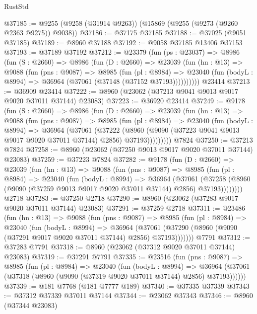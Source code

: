 \begin{lexlean}{RustStd}
\begin{coremodule}
@37185 := @9255 (@9258 (@31914 @9263)) (@15869 (@9255 (@9273 (@9260 @2363 @9275)) @9038))
@37186 := @37175 @37185
@37188 := @37025 (@9051 @37185)
@37189 := @8960 @37188
@37192 := @9058 @37185 @13406 @37153
@37193 := @37189 @37192
@37212 := @23379
    (fun (ps : @23037) =>
    @8986
      (fun (S : @2660) =>
      @8986
        (fun (D : @2660) =>
        @23039
          (fun (hn : @13) =>
          @9088
            (fun (pns : @9087) =>
            @8985
              (fun (pl : @8984) =>
              @23040 (fun (bodyL : @8994) => @36964 (@37061 (@37148 (@37152 @37193))))))))))
    @23414
@37213 := @36909 @23414
@37222 := @8960 (@23062 (@37213 @9041 @9013 @9017 @9020 @37011 @37144) @23083)
@37223 := @36920 @23414
@37249 := @9178
    (fun (S : @2660) =>
    @8986
      (fun (D : @2660) =>
      @23039
        (fun (hn : @13) =>
        @9088
          (fun (pns : @9087) =>
          @8985
            (fun (pl : @8984) =>
            @23040
              (fun (bodyL : @8994) =>
              @36964
                (@37061
                  (@37222
                    (@8960
                      (@9090 (@37223 @9041 @9013 @9017 @9020 @37011 @37144) @2856)
                      @37193)))))))))
    @7824
@37250 := @37213 @7824
@37258 := @8960 (@23062 (@37250 @9013 @9017 @9020 @37011 @37144) @23083)
@37259 := @37223 @7824
@37282 := @9178
    (fun (D : @2660) =>
    @23039
      (fun (hn : @13) =>
      @9088
        (fun (pns : @9087) =>
        @8985
          (fun (pl : @8984) =>
          @23040
            (fun (bodyL : @8994) =>
            @36964
              (@37061
                (@37258 (@8960 (@9090 (@37259 @9013 @9017 @9020 @37011 @37144) @2856) @37193))))))))
    @2718
@37283 := @37250 @2718
@37290 := @8960 (@23062 (@37283 @9017 @9020 @37011 @37144) @23083)
@37291 := @37259 @2718
@37311 := @23486
    (fun (hn : @13) =>
    @9088
      (fun (pns : @9087) =>
      @8985
        (fun (pl : @8984) =>
        @23040
          (fun (bodyL : @8994) =>
          @36964
            (@37061 (@37290 (@8960 (@9090 (@37291 @9017 @9020 @37011 @37144) @2856) @37193)))))))
    @7791
@37312 := @37283 @7791
@37318 := @8960 (@23062 (@37312 @9020 @37011 @37144) @23083)
@37319 := @37291 @7791
@37335 := @23516
    (fun (pns : @9087) =>
    @8985
      (fun (pl : @8984) =>
      @23040
        (fun (bodyL : @8994) =>
        @36964 (@37061 (@37318 (@8960 (@9090 (@37319 @9020 @37011 @37144) @2856) @37193))))))
@37339 := @181 @7768 (@181 @7777 @189)
@37340 := @37335 @37339
@37343 := @37312 @37339 @37011 @37144
@37344 := @23062 @37343
@37346 := @8960 (@37344 @23083)

\end{coremodule}
\end{lexlean}
